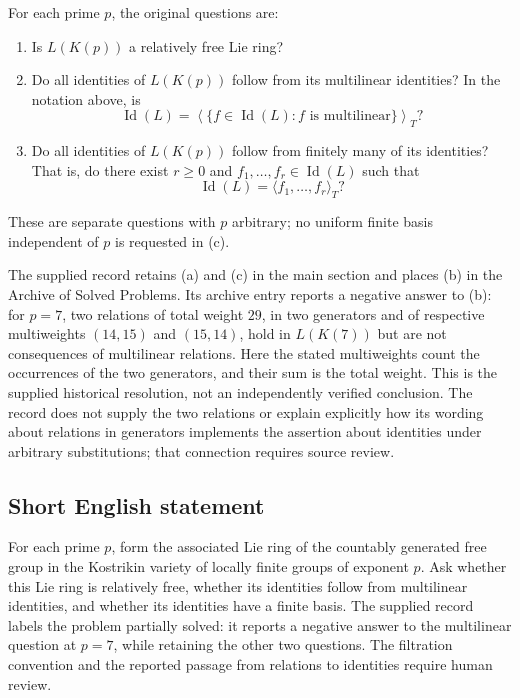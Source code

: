 \documentclass[11pt]{article}
\begin{document}
For each prime \(p\), the original questions are:
\begin{enumerate}
\item[(a)] Is \(L(K(p))\) a relatively free Lie ring?
\item[(b)] Do all identities of \(L(K(p))\) follow from its multilinear identities? In the notation above, is
\[
\operatorname{Id}(L)=\left\langle\{f\in\operatorname{Id}(L):f\text{ is multilinear}\}\right\rangle_T?
\]
\item[(c)] Do all identities of \(L(K(p))\) follow from finitely many of its identities? That is, do there exist \(r\geq 0\) and \(f_1,\ldots,f_r\in\operatorname{Id}(L)\) such that
\[
\operatorname{Id}(L)=\langle f_1,\ldots,f_r\rangle_T?
\]
\end{enumerate}
These are separate questions with \(p\) arbitrary; no uniform finite basis independent of \(p\) is requested in (c).

The supplied record retains (a) and (c) in the main section and places (b) in the Archive of Solved Problems. Its archive entry reports a negative answer to (b): for \(p=7\), two relations of total weight \(29\), in two generators and of respective multiweights \((14,15)\) and \((15,14)\), hold in \(L(K(7))\) but are not consequences of multilinear relations. Here the stated multiweights count the occurrences of the two generators, and their sum is the total weight. This is the supplied historical resolution, not an independently verified conclusion. The record does not supply the two relations or explain explicitly how its wording about relations in generators implements the assertion about identities under arbitrary substitutions; that connection requires source review.
\subsection{Short English statement}
For each prime \(p\), form the associated Lie ring of the countably generated free group in the Kostrikin variety of locally finite groups of exponent \(p\). Ask whether this Lie ring is relatively free, whether its identities follow from multilinear identities, and whether its identities have a finite basis. The supplied record labels the problem partially solved: it reports a negative answer to the multilinear question at \(p=7\), while retaining the other two questions. The filtration convention and the reported passage from relations to identities require human review.
\end{document}
